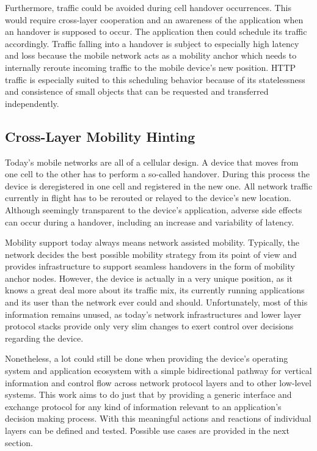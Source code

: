 Furthermore, traffic could be avoided during cell handover occurrences. This would require cross-layer cooperation and an awareness of the application when an handover is supposed to occur. The application then could schedule its traffic accordingly. Traffic falling into a handover is subject to especially high latency and loss because the mobile network acts as a mobility anchor which needs to internally reroute incoming traffic to the mobile device's new position. \gls{HTTP} traffic is especially suited to this scheduling behavior because of its statelessness and consistence of small objects that can be requested and transferred independently.


\subsection{Cross-Layer Mobility Hinting}

Today's mobile networks are all of a cellular design. A device that moves from one cell to the other has to perform a so-called handover. During this process the device is deregistered in one cell and registered in the new one. All network traffic currently in flight has to be rerouted or relayed to the device's new location. 
Although seemingly transparent to the device's application, adverse side effects can occur during a handover, including an increase and variability of latency. 

Mobility support today always means network assisted mobility. Typically, the network decides the best possible mobility strategy from its point of view and provides infrastructure to support seamless handovers in the form of mobility anchor nodes. However, the device is actually in a very unique position, as it knows a great deal more about its traffic mix, its currently running applications and its user than the network ever could and should.
Unfortunately, most of this information remains unused, as today's network infrastructures and lower layer protocol stacks provide only very slim changes to exert control over decisions regarding the device.

Nonetheless, a lot could still be done when providing the device's operating system and application ecosystem with a simple bidirectional pathway for vertical information and control flow across network protocol layers and to other low-level systems. This work aims to do just that by providing a generic interface and exchange protocol for any kind of information relevant to an application's decision making process. With this meaningful actions and reactions of individual layers can be defined and tested. Possible use cases are provided in the next section.

